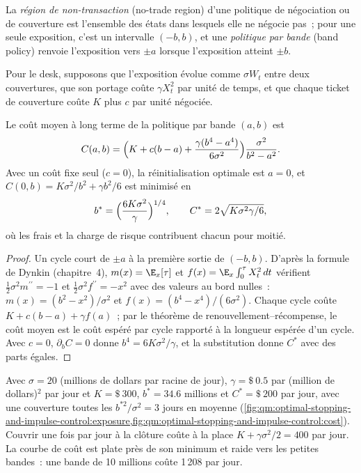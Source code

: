 \begin{definition}\label{def:qm:optimal-stopping-and-impulse-control:notrade}
La \emph{région de non-transaction} (no-trade region) d'une politique de négociation ou de couverture est l'ensemble des états dans lesquels elle ne
négocie pas~; pour une seule exposition, c'est un intervalle $(-b, b)$, et une \emph{politique par bande} (band policy) renvoie l'exposition vers $\pm a$ lorsque
l'exposition atteint $\pm b$.
\end{definition}

Pour le desk, supposons que l'exposition évolue comme $\sigma W_t$ entre deux couvertures, que son portage coûte $\gamma X_t^2$ par unité de temps, et
que chaque ticket de couverture coûte $K$ plus $c$ par unité négociée.

\begin{proposition}\label{prop:qm:optimal-stopping-and-impulse-control:band}
Le coût moyen à long terme de la politique par bande $(a, b)$ est
\[
C(a, b) = \Bigl(K + c(b - a) + \frac{\gamma(b^4 - a^4)}{6\sigma^2}\Bigr)\frac{\sigma^2}{b^2 - a^2}.
\]
Avec un coût fixe seul ($c = 0$), la réinitialisation optimale est $a = 0$, et $C(0, b) = K\sigma^2/b^2 + \gamma b^2/6$ est minimisé en
\[
b^* = \Bigl(\frac{6K\sigma^2}{\gamma}\Bigr)^{1/4}, \qquad C^* = 2\sqrt{K\sigma^2\gamma/6},
\]
où les frais et la charge de risque contribuent chacun pour moitié.
\end{proposition}

\begin{proof}
Un cycle court de $\pm a$ à la première sortie de $(-b, b)$. D'après la formule de Dynkin (chapitre~4), $m(x) = \E_x[\tau]$ et $f(x) =
\E_x\int_0^\tau X_t^2\,dt$ vérifient $\tfrac12\sigma^2m^{\prime\prime} = -1$ et $\tfrac12\sigma^2f^{\prime\prime} = -x^2$ avec des valeurs au bord nulles~: $m(x) = (b^2 -
x^2)/\sigma^2$ et $f(x) = (b^4 - x^4)/(6\sigma^2)$. Chaque cycle coûte $K + c(b - a) + \gamma f(a)$~; par le théorème de renouvellement--récompense, le
coût moyen est le coût espéré par cycle rapporté à la longueur espérée d'un cycle. Avec $c = 0$, $\partial_bC = 0$ donne $b^4 =
6K\sigma^2/\gamma$, et la substitution donne $C^*$ avec des parts égales.
\end{proof}

Avec $\sigma = 20$ (millions de dollars par racine de jour), $\gamma = \text{\$}~0.5$ par (million de dollars)$^2$ par jour et $K = \text{\$}~300$,
$b^* = 34.6$ millions et $C^* = \text{\$}~200$ par jour, avec une couverture toutes les $b^{*2}/\sigma^2 = 3$ jours en moyenne
(\cref{fig:qm:optimal-stopping-and-impulse-control:exposure,fig:qm:optimal-stopping-and-impulse-control:cost}).
Couvrir une fois par jour à la clôture coûte à la place $K + \gamma\sigma^2/2 = 400$ par jour. La courbe de coût est plate près de son minimum et
raide vers les petites bandes~: une bande de 10 millions coûte 1\,208 par jour.

